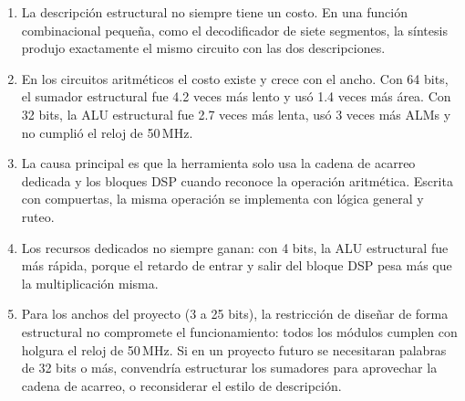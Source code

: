 \documentclass[11pt,letterpaper]{article}
\begin{document}
\begin{enumerate}
    \item La descripción estructural no siempre tiene un costo. En una función combinacional
    pequeña, como el decodificador de siete segmentos, la síntesis produjo exactamente el mismo
    circuito con las dos descripciones.
    \item En los circuitos aritméticos el costo existe y crece con el ancho. Con 64 bits, el
    sumador estructural fue 4.2 veces más lento y usó 1.4 veces más área. Con 32 bits, la ALU
    estructural fue 2.7 veces más lenta, usó 3 veces más ALMs y no cumplió el reloj de 50\,MHz.
    \item La causa principal es que la herramienta solo usa la cadena de acarreo dedicada y los
    bloques DSP cuando reconoce la operación aritmética. Escrita con compuertas, la misma
    operación se implementa con lógica general y ruteo.
    \item Los recursos dedicados no siempre ganan: con 4 bits, la ALU estructural fue más rápida,
    porque el retardo de entrar y salir del bloque DSP pesa más que la multiplicación misma.
    \item Para los anchos del proyecto (3 a 25 bits), la restricción de diseñar de forma
    estructural no compromete el funcionamiento: todos los módulos cumplen con holgura el reloj
    de 50\,MHz. Si en un proyecto futuro se necesitaran palabras de 32 bits o más, convendría
    estructurar los sumadores para aprovechar la cadena de acarreo, o reconsiderar el estilo de
    descripción.
\end{enumerate}
\end{document}
